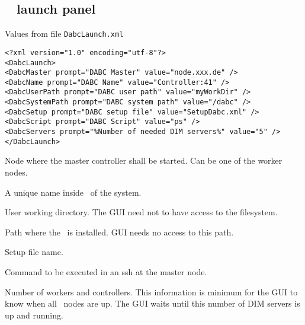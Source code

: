 \subsection{\dabc~ launch panel}
Values from file {\tt DabcLaunch.xml}
{\small \begin{verbatim}
<?xml version="1.0" encoding="utf-8"?>
<DabcLaunch>
<DabcMaster prompt="DABC Master" value="node.xxx.de" />
<DabcName prompt="DABC Name" value="Controller:41" />
<DabcUserPath prompt="DABC user path" value="myWorkDir" />
<DabcSystemPath prompt="DABC system path" value="/dabc" />
<DabcSetup prompt="DABC setup file" value="SetupDabc.xml" />
<DabcScript prompt="DABC Script" value="ps" />
<DabcServers prompt="%Number of needed DIM servers%" value="5" />
</DabcLaunch>
\end{verbatim}
\bdes
\item[DabcMaster:] Node where the master controller shall be started.
Can be one of the worker nodes.
\item[DabcName:] A unique name inside \dabc\ of the system.
\item[DabcUserPath:] User working directory. The GUI need not to have
access to the filesystem. 
\item[DabcSystemPath:] Path where the \dabc\ is installed. GUI needs no access to this path.
\item[DabcSetup:] Setup file name.
\item[DabcScript:] Command to be executed in an ssh at the master node.
\item[DabcServers:] Number of workers and controllers. This information
is minimum for the GUI to know when all \dabc\ nodes are up. The GUI waits until
this number of DIM servers is up and running.
\edes
}

